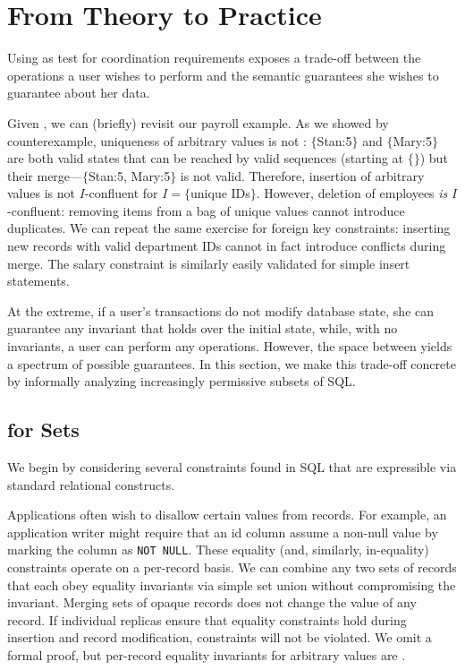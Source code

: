 
\section{From Theory to Practice}
\label{sec:bcc-practice}

Using \iconfluence as test for coordination requirements exposes a
trade-off between the operations a user wishes to perform and the
semantic guarantees she wishes to guarantee about her data.

 Given \iconfluence, we can (briefly)
revisit our payroll example. As we showed by counterexample,
uniqueness of arbitrary values is not \iconfluent: $\{$Stan:5$\}$ and
$\{$Mary:5$\}$ are both valid states that can be reached by valid
sequences (starting at $\{\}$) but their merge---$\{$Stan:5,
Mary:5$\}$ is not valid. Therefore, insertion of arbitrary values is
not $I$-confluent for $I=\{$unique IDs$\}$. However, deletion of
employees \textit{is} $I$-confluent: removing items from a bag of
unique values cannot introduce duplicates. We can repeat the same
exercise for foreign key constraints: inserting new records with valid
department IDs cannot in fact introduce conflicts during merge. The
salary constraint is similarly easily validated for simple insert
statements.

At the extreme, if a user's transactions do not modify database state,
she can guarantee any invariant that holds over the initial state,
while, with no invariants, a user can perform any operations. However,
the space between yields a spectrum of possible \iconfluent
guarantees. In this section, we make this trade-off concrete by
informally analyzing increasingly permissive subsets of SQL.

\subsection{\iconfluence for Sets}

We begin by considering several constraints found in SQL that are
expressible via standard relational constructs.

 Applications often wish to disallow certain values
from records. For example, an application writer might require that an
id column assume a non-null value by marking the column as \texttt{NOT
  NULL}. These equality (and, similarly, in-equality) constraints
operate on a per-record basis. We can combine any two sets of records
that each obey equality invariants via simple set union without
compromising the invariant. Merging sets of opaque records does not
change the value of any record. If individual replicas ensure that
equality constraints hold during insertion and record modification,
constraints will not be violated. We omit a formal proof, but
per-record equality invariants for arbitrary values are \iconfluent.


